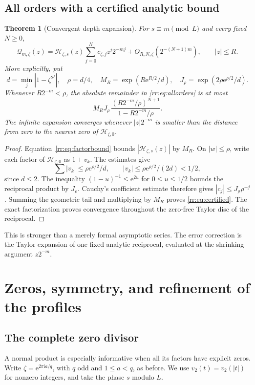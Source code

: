 \documentclass[11pt,a4paper,oneside,openany]{book}
\numberwithin{equation}{chapter}
\newtheorem{theorem}{Theorem}[chapter]
\theoremstyle{definition}
\theoremstyle{remark}
\newcommand{\e}{\mathrm e}
\newcommand{\ii}{\mathrm i}
\newcommand{\Hp}{\mathcal H}
\newcommand{\Qp}{\mathcal Q}
\begin{document}
\section{All orders with a certified analytic bound}
\begin{theorem}[Convergent depth expansion]
\label{rr:thm:correction}
For \(s\equiv m\pmod L\) and every fixed \(N\geq0\),
\begin{equation}
 \Qp_{m,\zeta}(z)
 =\Hp_{\zeta,s}(z)\sum_{j=0}^N c_{\zeta,j}z^j2^{-mj}
       +O_{R,N,\zeta}(2^{-(N+1)m}),\qquad |z|\leq R.
 \label{rr:eq:allorders}
\end{equation}
More explicitly, put
\[
 d=\min_j|1-\zeta^{2^j}|,\quad \rho=d/4,\quad
 M_R=\exp(R\e^{R/2}/d),\quad
 J_\rho=\exp(2\rho\e^{\rho/2}/d).
\]
Whenever \(R2^{-m}<\rho\), the absolute remainder in \eqref{rr:eq:allorders} is at most
\begin{equation}
 M_RJ_\rho\,
 \frac{(R2^{-m}/\rho)^{N+1}}{1-R2^{-m}/\rho}.
 \label{rr:eq:certified}
\end{equation}
The infinite expansion converges whenever \(|z|2^{-m}\) is smaller than the distance from zero to the nearest zero of \(\Hp_{\zeta,0}\).
\end{theorem}
\begin{proof}
Equation~\eqref{rr:eq:factorbound} bounds \(|\Hp_{\zeta,s}(z)|\) by \(M_R\). On \(|w|\leq\rho\), write each factor of \(\Hp_{\zeta,0}\) as \(1+v_k\). The estimates give
\[
 \sum|v_k|\leq\rho\e^{\rho/2}/d,
 \qquad |v_k|\leq\rho\e^{\rho/2}/(2d)<1/2,
\]
since \(d\leq2\). The inequality \((1-u)^{-1}\leq\e^{2u}\) for \(0\leq u\leq1/2\) bounds the reciprocal product by \(J_\rho\). Cauchy's coefficient estimate therefore gives \(|c_j|\leq J_\rho\rho^{-j}\). Summing the geometric tail and multiplying by \(M_R\) proves \eqref{rr:eq:certified}. The exact factorization proves convergence throughout the zero-free Taylor disc of the reciprocal.
\end{proof}

This is stronger than a merely formal asymptotic series. The error correction is the Taylor expansion of one fixed analytic reciprocal, evaluated at the shrinking argument \(z2^{-m}\).
\chapter{Zeros, symmetry, and refinement of the profiles}
\label{rr:sec:geometry}

\section{The complete zero divisor}
A normal product is especially informative when all its factors have explicit zeros. Write \(\zeta=\e^{2\pi\ii a/q}\), with \(q\) odd and \(1\leq a<q\), as before. We use \(v_2(t)=v_2(|t|)\) for nonzero integers, and take the phase \(s\) modulo \(L\).
\end{document}
